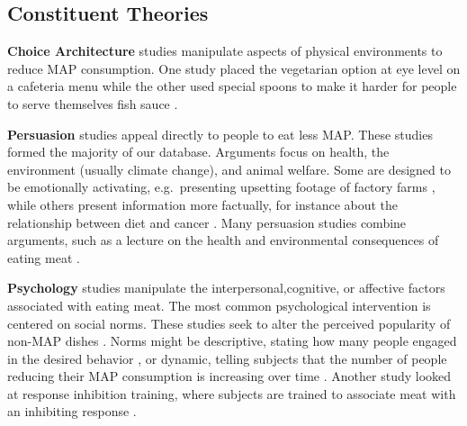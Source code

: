 \documentclass[sn-nature,referee,pdflatex]{sn-jnl}
\begin{document}
\begin{centering}
\end{centering}

\subsection{Constituent Theories}\label{constituent-theories}

\textbf{Choice Architecture} studies
\citep{andersson2021, kanchanachitra2020} manipulate aspects of physical
environments to reduce MAP consumption. One study placed the vegetarian
option at eye level on a cafeteria menu \citep{andersson2021} while the
other used special spoons to make it harder for people to serve
themselves fish sauce \citep{kanchanachitra2020}.

\textbf{Persuasion} studies
\citep{kanchanachitra2020, abrahamse2007, acharya2004, banerjee2019, bianchi2022, bochmann2017, bschaden2020, carfora2023, hennessy2016, piester2020, cooney2014, cooney2016, feltz2022, haile2021, hatami2018, jalil2023, mathur2021effectiveness, merrill2009, norris2014, peacock2017, polanco2022, sparkman2021, weingarten2022}
appeal directly to people to eat less MAP. These studies formed the
majority of our database. Arguments focus on health, the environment
(usually climate change), and animal welfare. Some are designed to be
emotionally activating, e.g.~presenting upsetting footage of factory
farms \citep{polanco2022}, while others present information more
factually, for instance about the relationship between diet and cancer
\citep{hatami2018}. Many persuasion studies combine arguments, such as a
lecture on the health and environmental consequences of eating meat
\citep{jalil2023}.

\textbf{Psychology} studies
\citep{aldoh2023, allen2002, camp2019, coker2022, piester2020, sparkman2020}
manipulate the interpersonal,cognitive, or affective factors associated
with eating meat. The most common psychological intervention is centered
on social norms. These studies seek to alter the perceived popularity of
non-MAP dishes \citep{sparkman2020}. Norms might be descriptive, stating
how many people engaged in the desired behavior \citep{aldoh2023}, or
dynamic, telling subjects that the number of people reducing their MAP
consumption is increasing over time
\citep{aldoh2023, coker2022, sparkman2020}. Another study looked at
response inhibition training, where subjects are trained to associate
meat with an inhibiting response \citep{camp2019}.
\end{document}
